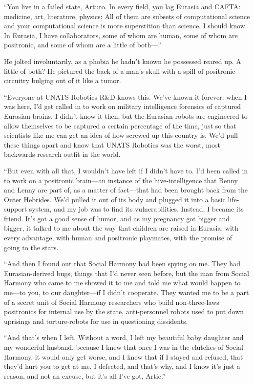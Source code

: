 “You live in a failed state, Arturo. In every field, you lag
Eurasia and CAFTA: medicine, art, literature, physics; All of them
are subsets of computational science and your computational science
is more superstition than science. I should know. In Eurasia, I
have collaborators, some of whom are human, some of whom are
positronic, and some of whom are a little of both—”

He jolted involuntarily, as a phobia he hadn’t known he possessed
reared up. A little of both? He pictured the back of a man’s skull
with a spill of positronic circuitry bulging out of it like a
tumor.

“Everyone at UNATS Robotics R\&D knows this. We’ve known it
forever: when I was here, I’d get called in to work on military
intelligence forensics of captured Eurasian brains. I didn’t know
it then, but the Eurasian robots are engineered to allow themselves
to be captured a certain percentage of the time, just so that
scientists like me can get an idea of how screwed up this country
is. We’d pull these things apart and know that UNATS Robotics was
the worst, most backwards research outfit in the world.

“But even with all that, I wouldn’t have left if I didn’t have to.
I’d been called in to work on a positronic brain—an instance of the
hive-intelligence that Benny and Lenny are part of, as a matter of
fact—that had been brought back from the Outer Hebrides. We’d
pulled it out of its body and plugged it into a basic life-support
system, and my job was to find its vulnerabilities. Instead, I
became its friend. It’s got a good sense of humor, and as my
pregnancy got bigger and bigger, it talked to me about the way that
children are raised in Eurasia, with every advantage, with human
and positronic playmates, with the promise of going to the stars.

“And then I found out that Social Harmony had been spying on me.
They had Eurasian-derived bugs, things that I’d never seen before,
but the man from Social Harmony who came to me showed it to me and
told me what would happen to me—to you, to our daughter—if I didn’t
cooperate. They wanted me to be a part of a secret unit of Social
Harmony researchers who build non-three-laws positronics for
internal use by the state, anti-personnel robots used to put down
uprisings and torture-robots for use in questioning dissidents.

“And that’s when I left. Without a word, I left my beautiful baby
daughter and my wonderful husband, because I knew that once I was
in the clutches of Social Harmony, it would only get worse, and I
knew that if I stayed and refused, that they’d hurt you to get at
me. I defected, and that’s why, and I know it’s just a reason, and
not an excuse, but it’s all I’ve got, Artie.”

